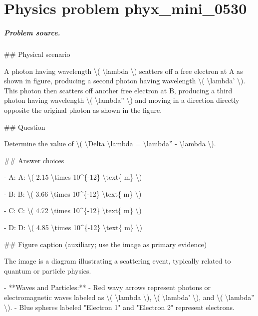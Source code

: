 
\chapter{Physics problem phyx\_mini\_0530}
\label{ch:PhyXMiniProblems_problem_phyx_mini_0530}

\paragraph{Problem source.}
\#\# Physical scenario

A photon having wavelength \textbackslash{}( \textbackslash{}lambda \textbackslash{}) scatters off a free electron at A as shown in figure, producing a second photon having wavelength \textbackslash{}( \textbackslash{}lambda' \textbackslash{}). This photon then scatters off another free electron at B, producing a third photon having wavelength \textbackslash{}( \textbackslash{}lambda'' \textbackslash{}) and moving in a direction directly opposite the original photon as shown in the figure.

\#\# Question

Determine the value of \textbackslash{}( \textbackslash{}Delta \textbackslash{}lambda = \textbackslash{}lambda'' - \textbackslash{}lambda \textbackslash{}).

\#\# Answer choices

- A: A: \textbackslash{}( 2.15 \textbackslash{}times 10\textasciicircum{}\{-12\} \textbackslash{}text\{ m\} \textbackslash{})

- B: B: \textbackslash{}( 3.66 \textbackslash{}times 10\textasciicircum{}\{-12\} \textbackslash{}text\{ m\} \textbackslash{})

- C: C: \textbackslash{}( 4.72 \textbackslash{}times 10\textasciicircum{}\{-12\} \textbackslash{}text\{ m\} \textbackslash{})

- D: D: \textbackslash{}( 4.85 \textbackslash{}times 10\textasciicircum{}\{-12\} \textbackslash{}text\{ m\} \textbackslash{})

\#\# Figure caption (auxiliary; use the image as primary evidence)

The image is a diagram illustrating a scattering event, typically related to quantum or particle physics. 

- **Waves and Particles:**
  - Red wavy arrows represent photons or electromagnetic waves labeled as \textbackslash{}( \textbackslash{}lambda \textbackslash{}), \textbackslash{}( \textbackslash{}lambda' \textbackslash{}), and \textbackslash{}( \textbackslash{}lambda'' \textbackslash{}).
  - Blue spheres labeled "Electron 1" and "Electron 2" represent electrons.

